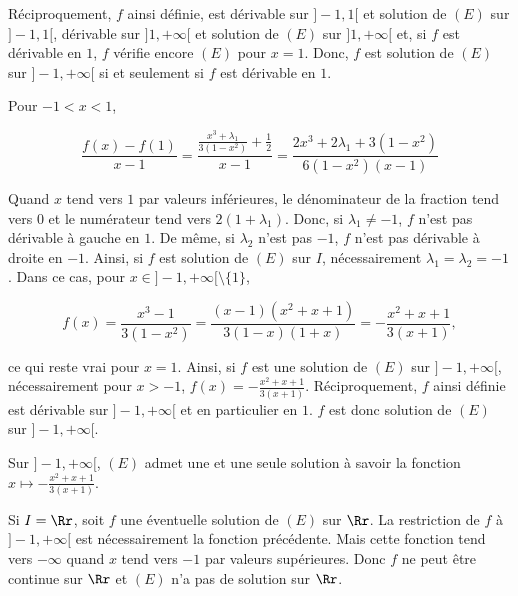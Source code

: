 {{Réciproquement, $f$ ainsi définie, est dérivable sur $]-1,1[$ et solution de $(E)$ sur $]-1,1[$, dérivable sur
$]1,+\infty[$ et solution de $(E)$ sur $]1,+\infty[$ et, si $f$ est dérivable en $1$, $f$ vérifie encore $(E)$ pour
$x=1$. Donc, $f$ est solution de $(E)$ sur $]-1,+\infty[$ si et seulement si $f$ est dérivable en $1$.

Pour $-1<x<1$,

$$\frac{f(x)-f(1)}{x-1}=\frac{\frac{x^3+\lambda_1}{3(1-x^2)}+\frac{1}{2}}{x-1}=\frac{2x^3+2\lambda_1+3(1-x^2)}
{6(1-x^2)(x-1)}$$

Quand $x$ tend vers $1$ par valeurs inférieures, le dénominateur de la fraction tend vers $0$ et le numérateur tend vers
$2(1+\lambda_1)$. Donc, si $\lambda_1\neq-1$, $f$ n'est pas dérivable à gauche en $1$. De même, si $\lambda_2$ n'est pas
$-1$, $f$ n'est pas dérivable à droite en $-1$. Ainsi, si $f$ est solution de $(E)$ sur $I$, nécessairement
$\lambda_1=\lambda_2=-1$. Dans ce cas, pour $x\in]-1,+\infty[\setminus\{1\}$,

$$f(x)=\frac{x^3-1}{3(1-x^2)}=\frac{(x-1)(x^2+x+1)}{3(1-x)(1+x)}=-\frac{x^2+x+1}{3(x+1)},$$

ce qui reste vrai pour $x=1$. Ainsi, si $f$ est une solution de $(E)$ sur $]-1,+\infty[$, nécessairement
pour $x>-1$, $f(x)=-\frac{x^2+x+1}{3(x+1)}$. Réciproquement, $f$ ainsi définie est dérivable sur $]-1,+\infty[$ et en
particulier en $1$. $f$ est donc solution de $(E)$ sur $]-1,+\infty[$.

Sur $]-1,+\infty[$, $(E)$ admet une et une seule solution à savoir la fonction $x\mapsto-\frac{x^2+x+1}{3(x+1)}$.

Si $I=\Rr$, soit $f$ une éventuelle solution de $(E)$ sur $\Rr$. La restriction de $f$ à $]-1,+\infty[$ est
nécessairement la fonction précédente. Mais cette fonction tend vers $-\infty$ quand $x$ tend vers $-1$ par valeurs
supérieures. Donc $f$ ne peut être continue sur $\Rr$ et $(E)$ n'a pas de solution sur $\Rr$.
}
}
